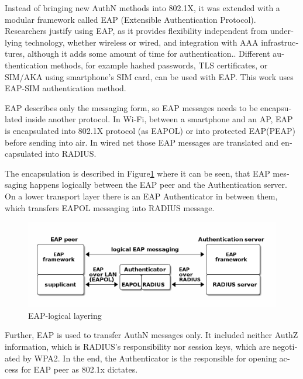 \documentclass[12pt,a4paper,english]{tutthesis}
\begin{document}
\begin{otherlanguage}{english}
Instead of bringing new AuthN methods into 802.1X, it was 
extended with a modular framework called 
 EAP (Extensible Authentication Protocol)\cite{rfc5247}. 
Researchers justify using EAP, as it
provides flexibility independent from underlying technology, whether
wireless or wired,  and integration with AAA infrastructures, although
it adds some amount of time for authentication.\cite{pereniguez10}.
Different authentication methods, for example hashed passwords, TLS
 certificates, or SIM/AKA using smartphone's SIM card,  can
be used with EAP.
This work uses EAP-SIM authentication method.


EAP describes only the messaging form, so EAP messages needs to
be encapsulated inside another protocol.  In Wi-Fi, between a smartphone
and an AP, EAP is encapsulated into 802.1X protocol (as EAPOL) or
into protected EAP(PEAP)\cite{peap} before sending
into air. In wired net those EAP messages are translated and encapsulated into RADIUS.

The encapsulation is described in Figure\ref{fig:eap-layers} where it
can be seen, that EAP messaging happens logically between the EAP peer
and the
Authentication server. On a lower transport layer there is an EAP
Authenticator in between them, which transfers EAPOL messaging into
RADIUS message.





\begin{figure}[htb]
\centering
\includegraphics[width=.9\linewidth]{eap-layer.png}
\caption{\label{fig:eap-layers}EAP-logical layering}
\end{figure}


Further, EAP is used to transfer AuthN messages only.
It included neither AuthZ information, which is RADIUS's
responsibility nor session keys, which are negotiated by WPA2.  In the
end,
the Authenticator is the responsible for opening access for EAP peer as 802.1x
dictates.




\end{otherlanguage}
\end{document}
